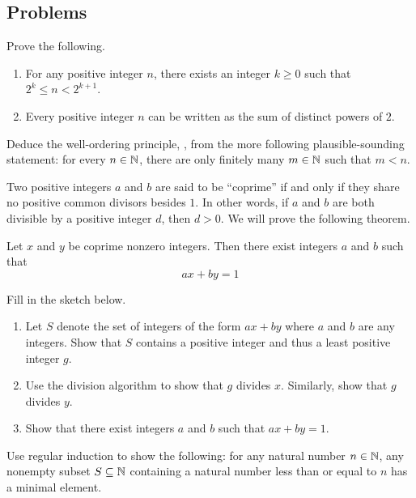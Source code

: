 \documentclass[../main.tex]{subfiles}
\begin{document}
\subsection{Problems}
\begin{homework}
    Prove the following.
    \begin{enumerate}[label=(\alph*)]
        \item For any positive integer $n$, there exists an integer $k\ge0$ such that $2^k\le n<2^{k+1}$.
        \item Every positive integer $n$ can be written as the sum of distinct powers of $2$.
    \end{enumerate}
\end{homework}

\begin{homework}
    Deduce the well-ordering principle, , from the more following plausible-sounding statement: for every $n \in \mathbb N$, there are only finitely many $m \in \mathbb N$ such that $m < n$.
\end{homework}

\begin{homework}
    Two positive integers $a$ and $b$ are said to be ``coprime'' if and only if they share no positive common divisors besides $1$. In other words, if $a$ and $b$ are both divisible by a positive integer $d$, then $d>0$. We will prove the following theorem.
    \begin{theorem}[Bezout]
        Let $x$ and $y$ be coprime nonzero integers. Then there exist integers $a$ and $b$ such that
        \begin{equation*}
            ax + by = 1
        \end{equation*}
    \end{theorem}
    Fill in the sketch below.
    \begin{enumerate}[label=(\alph*)]
        \item Let $S$ denote the set of integers of the form $ax+by$ where $a$ and $b$ are any integers. Show that $S$ contains a positive integer and thus a least positive integer $g$.
        \item Use the division algorithm to show that $g$ divides $x$. Similarly, show that $g$ divides $y$.
        \item Show that there exist integers $a$ and $b$ such that $ax+by=1$.
    \end{enumerate}
\end{homework}

\begin{homework}
    Use regular induction to show the following: for any natural number $n\in\mathbb N$, any nonempty subset $S\subseteq\mathbb N$ containing a natural number less than or equal to $n$ has a minimal element.
\end{homework}
\end{document}
